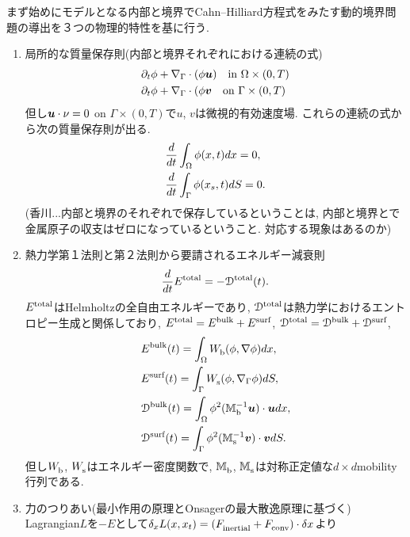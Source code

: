 \documentclass[a4paper]{article}
\begin{document}
まず始めにモデルとなる内部と境界でCahn--Hilliard方程式をみたす動的境界問題の導出を３つの物理的特性を基に行う.
\begin{enumerate}
	\item 局所的な質量保存則(内部と境界それぞれにおける連続の式)
	\begin{align}
		&\partial_t\phi + \nabla_{\Gamma}\cdot(\phi\bm{u})\quad\text{in }\Omega\times(0,T)\\
		&\partial_t\phi + \nabla_{\Gamma}\cdot(\phi\bm{v}\quad\text{on }\Gamma\times(0,T)
	\end{align}
	但し$\bm{u}\cdot\nu = 0$ on $\Gamma\times(0,T)$で$u$, $v$は微視的有効速度場.
	これらの連続の式から次の質量保存則が出る.
	\begin{align}
		&\frac{d}{dt}\int_{\Omega}\phi(x,t)dx = 0,\\
		&\frac{d}{dt}\int_{\Gamma}\phi(x_s,t)dS = 0.
	\end{align}
	(香川...内部と境界のそれぞれで保存しているということは, 内部と境界とで金属原子の収支はゼロになっているということ.
	対応する現象はあるのか)
	\item 熱力学第１法則と第２法則から要請されるエネルギー減衰則
	\begin{equation}
		\frac{d}{dt}{E}^{\text{total}}_{\text{}} = -{\mathcal{D}}^{\text{total}}_{\text{}}(t).
	\end{equation}
	${E}^{\text{total}}_{\text{}}$はHelmholtzの全自由エネルギーであり, ${\mathcal{D}}^{\text{total}}_{\text{}}$は熱力学におけるエントロピー生成と関係しており, ${E}^{\text{total}}_{\text{}} = {E}^{\text{bulk}}_{\text{}} + {E}^{\text{surf}}_{\text{}}$, ${\mathcal{D}}^{\text{total}}_{\text{}} = {\mathcal{D}}^{\text{bulk}}_{\text{}} + {\mathcal{D}}^{\text{surf}}_{\text{}}$,
	\begin{align}
		&{E}^{\text{bulk}}_{\text{}}(t) = \int_{\Omega} {W}^{\text{}}_{\text{b}}(\phi,\nabla\phi)dx,\\
		&{E}^{\text{surf}}_{\text{}}(t) = \int_{\Gamma}{W}^{\text{}}_{\text{s}}(\phi,\nabla_{\Gamma}\phi)dS,\\
		&{\mathcal{D}}^{\text{bulk}}_{\text{}}(t) = \int_{\Omega}\phi^2({\mathbb{M}}^{\text{$-1$}}_{\text{b}}\bm{u})\cdot\bm{u}dx,\\
		&{\mathcal{D}}^{\text{surf}}_{\text{}}(t) = \int_{\Gamma}\phi^2({\mathbb{M}}^{\text{$-1$}}_{\text{s}}\bm{v})\cdot\bm{v}dS.
	\end{align}
	但し${W}^{\text{}}_{\text{b}}$, ${W}^{\text{}}_{\text{s}}$はエネルギー密度関数で,
	${\mathbb{M}}^{\text{}}_{\text{b}}$, ${\mathbb{M}}^{\text{}}_{\text{s}}$は対称正定値な$d\times d$mobility行列である.
	\item 力のつりあい(最小作用の原理とOnsagerの最大散逸原理に基づく)
	Lagrangian$L$を$-E$として$\delta_x L(x,x_t)=({F}^{\text{}}_{\text{inertial}} + {F}^{\text{}}_{\text{conv}})\cdot\delta x$より
	\begin{align}

\end{align}
\end{enumerate}
\end{document}
